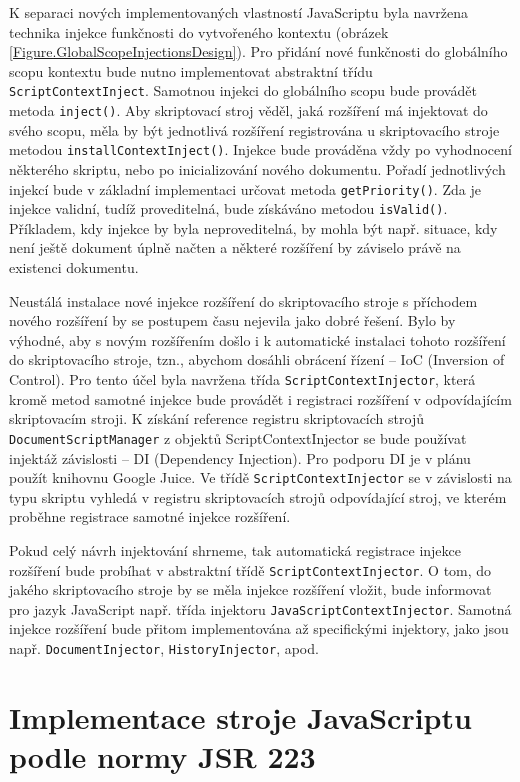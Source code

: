 K separaci nových implementovaných vlastností JavaScriptu byla navržena technika injekce funkčnosti do vytvořeného kontextu (obrázek \ref{Figure.GlobalScopeInjectionsDesign}). Pro přidání nové funkčnosti do globálního scopu kontextu bude nutno implementovat abstraktní třídu \texttt{ScriptContextInject}. Samotnou injekci do globálního scopu bude provádět metoda \texttt{inject()}. Aby skriptovací stroj věděl, jaká rozšíření má injektovat do svého scopu, měla by být jednotlivá rozšíření registrována u skriptovacího stroje metodou \texttt{installContextInject()}. Injekce bude prováděna vždy po vyhodnocení některého skriptu, nebo po inicializování nového dokumentu. Pořadí jednotlivých injekcí bude v základní implementaci určovat metoda \texttt{getPriority()}. Zda je injekce validní, tudíž proveditelná, bude získáváno metodou \texttt{isValid()}. Příkladem, kdy injekce by byla neproveditelná, by mohla být např. situace, kdy není ještě dokument úplně načten a některé rozšíření by záviselo právě na existenci dokumentu.

Neustálá instalace nové injekce rozšíření do skriptovacího stroje s příchodem nového rozšíření by se postupem času nejevila jako dobré řešení. Bylo by výhodné, aby s novým rozšířením došlo i k automatické instalaci tohoto rozšíření do skriptovacího stroje, tzn., abychom dosáhli obrácení řízení -- IoC (Inversion of Control). Pro tento účel byla navržena třída \texttt{ScriptContextInjector}, která kromě metod samotné injekce bude provádět i registraci rozšíření v odpovídajícím skriptovacím stroji. K získání reference registru skriptovacích strojů \texttt{DocumentScriptManager} z objektů ScriptContextInjector se bude používat injektáž závislosti -- DI (Dependency Injection). Pro podporu DI je v plánu použít knihovnu Google Juice. Ve třídě \texttt{ScriptContextInjector} se v závislosti na typu skriptu vyhledá v registru skriptovacích strojů odpovídající stroj, ve kterém proběhne registrace samotné injekce rozšíření. 

Pokud celý návrh injektování shrneme, tak automatická registrace injekce rozšíření bude probíhat v abstraktní třídě \texttt{ScriptContextInjector}. O tom, do jakého skriptovacího stroje by se měla injekce rozšíření vložit, bude informovat pro jazyk JavaScript např. třída injektoru \texttt{JavaScriptContextInjector}. Samotná injekce rozšíření bude přitom implementována až specifickými injektory, jako jsou např. \texttt{DocumentInjector}, \texttt{HistoryInjector}, apod.

\section{Implementace stroje JavaScriptu podle normy JSR 223}
\label{Chapter.Design.JavaScriptEngineJSR223}


